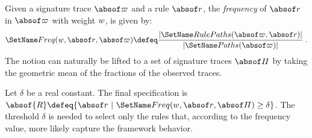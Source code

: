 %
%
Given a signature trace $\abstrace$ and a rule $\absrule$,
the \emph{frequency} of $\absrule$ in $\abstrace$ with weight
$w$, is given by:
\[
\TraceFreq{\weight}{\absrule}{\abstrace} \defeq
\frac{\Card{\AbsPathsRule{\abstrace}{\absrule}}}{\Card{\AbsPaths{\abstrace}}}\;.
\]
%
%
The notion can naturally be lifted to a set of signature traces
$\abstraceset$ by taking the geometric mean of the fractions of the
observed traces.

Let $\delta$ be a real constant. The final specification is
\(
\absof{\directiveset} \defeq \{\absrule\ |\ \TraceFreq{\weight}{\absrule}{\abstraceset} \ge \threshold \}
\).
The threshold $\delta$ is needed to select only the rules that, according to
the frequency value, more likely capture the framework behavior.

